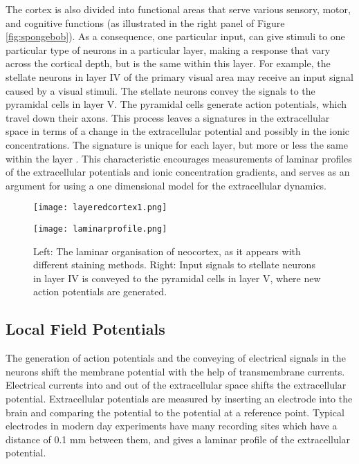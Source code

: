 \documentclass{article}
\begin{document}
The cortex is also divided into functional areas that serve various sensory, motor, and cognitive functions (as illustrated in the right panel of Figure \ref{fig:spongebob}). As a consequence, one particular input, can give stimuli to one particular type of neurons in a particular layer, making a response that vary across the cortical depth, but is the same within this layer. For example, the stellate neurons in layer IV of the primary visual area may receive an input signal caused by a visual stimuli. The stellate neurons convey the signals to the pyramidal cells in layer V. The pyramidal cells generate action potentials, which travel down their axons. This process leaves a signatures in the extracellular space in terms of a change in the extracellular potential and possibly in the ionic concentrations. The signature is unique for each layer, but more or less the same within the layer \cite{neuroscience}. This characteristic encourages measurements of laminar profiles of the extracellular potentials and ionic concentration gradients, and serves as an argument for using a one dimensional model for the extracellular dynamics. \cite{Mayer2010}



\begin{figure}[!tbp]
  \centering
  \begin{minipage}[b]{0.5\textwidth}
    \texttt{[image: layeredcortex1.png]}
  \end{minipage}
  \begin{minipage}[b]{0.45\textwidth}
    \texttt{[image: laminarprofile.png]}
  \end{minipage}  
   \caption{Left: The laminar organisation of neocortex, as it appears with different staining methods. Right: Input signals to stellate neurons in layer IV is conveyed to the pyramidal cells in layer V, where new action potentials are generated.}
  \label{fig:laminarcortex}
\end{figure}



\subsection{Local Field Potentials}\label{Local Field Potentials}
The generation of action potentials and the conveying of electrical signals in the neurons shift the membrane potential with the help of transmembrane currents. Electrical currents into and out of the extracellular space shifts the extracellular potential. Extracellular potentials are measured by inserting an electrode into the brain and comparing the potential to the potential at a reference point. Typical  electrodes in modern day experiments have many recording sites which have a distance of 0.1 mm \cite{EinevollLFP} between them, and gives a laminar profile of the extracellular potential. 
\end{document}
